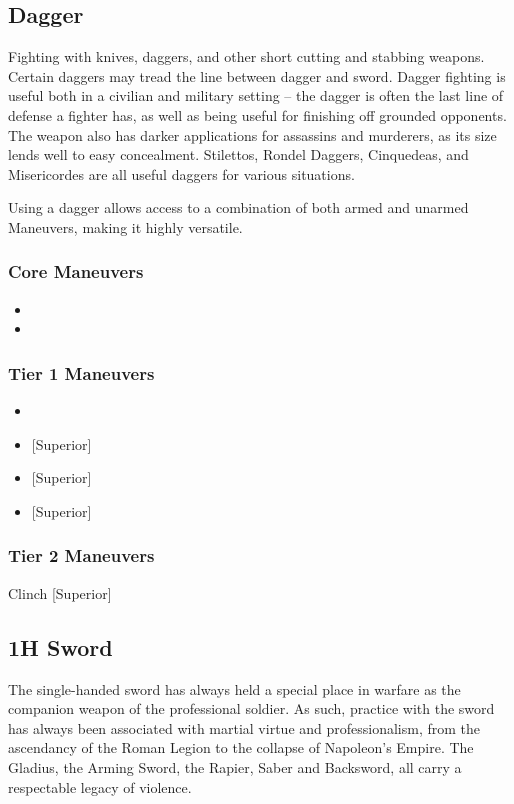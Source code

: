 \documentclass[oneside,11pt,english]{book}
\begin{document}
\subsection{Dagger}
Fighting with knives, daggers, and other short cutting and stabbing weapons. Certain daggers may tread 
the line between dagger and sword. Dagger fighting is useful both in a civilian and military setting -- the 
dagger is often the last line of defense a fighter has, as well as being useful for finishing off grounded 
opponents. The weapon also has darker applications for assassins and murderers, as its size lends well to 
easy concealment. Stilettos, Rondel Daggers, Cinquedeas, and Misericordes are all useful daggers for various situations.

Using a dagger allows access to a combination of both armed and unarmed Maneuvers, making it highly 
versatile. 

\subsubsection{Core Maneuvers}
\vspace{-5pt}\begin{itemize}
	[itemsep=0.5mm]
	\item {}
	\item {}
\end{itemize}

\subsubsection{Tier 1 Maneuvers}
\vspace{-5pt}\begin{itemize}
	[itemsep=0.5mm]
	\item {}
	\item {} [Superior]
	\item {} [Superior]
	\item {} [Superior]
\end{itemize}
\subsubsection{Tier 2 Maneuvers}
Clinch [Superior]

\subsection{1H Sword}
The single-handed sword has always held a special place in warfare as the companion weapon of the 
professional soldier. As such, practice with the sword has always been associated with martial virtue and 
professionalism, from the ascendancy of the Roman Legion to the collapse of Napoleon’s Empire. The 
Gladius, the Arming Sword, the Rapier, Saber and Backsword, all carry a respectable legacy of violence. 
\end{document}
